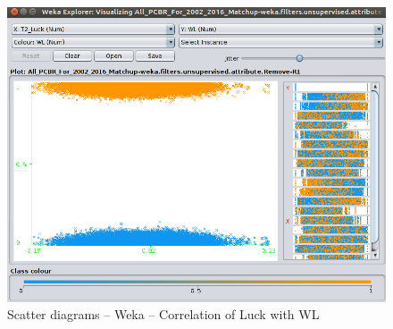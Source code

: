 \documentclass[
10pt, %
a4paper, %
oneside, %
headinclude,footinclude, %
BCOR5mm, %
]{scrartcl}
\begin{document}
\begin{figure}[H]
\caption{Scatter diagrams – Weka – Correlation of Luck with WL}
  \centering
\includegraphics[width=\textwidth]{Weka_Correlation_Luck_WL}
\end{figure}
\end{document}
